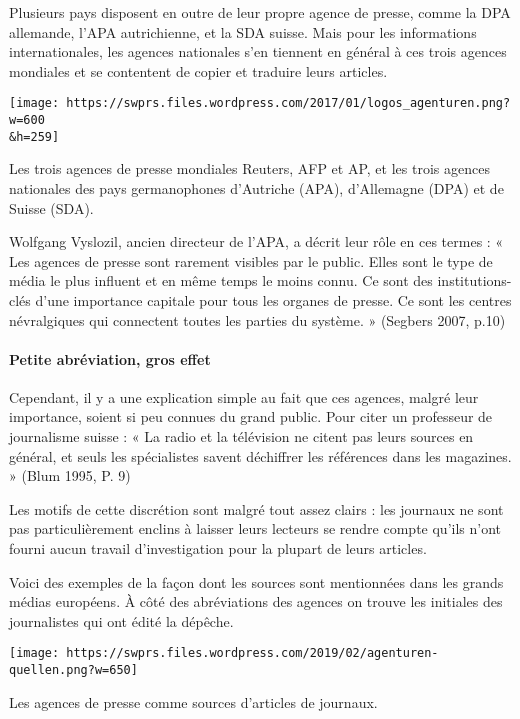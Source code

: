 Plusieurs pays disposent en outre de leur propre agence de presse, comme
la DPA allemande, l'APA autrichienne, et la SDA suisse. Mais pour les
informations internationales, les agences nationales s'en tiennent en
général à ces trois agences mondiales et se contentent de copier et
traduire leurs articles.

\texttt{[image: https://swprs.files.wordpress.com/2017/01/logos\_agenturen.png?w=600\\\&h=259]}

Les trois agences de presse mondiales Reuters, AFP et AP, et les trois
agences nationales des pays germanophones d'Autriche (APA), d'Allemagne
(DPA) et de Suisse (SDA).

Wolfgang Vyslozil, ancien directeur de l'APA, a décrit leur rôle en ces
termes : « Les agences de presse sont rarement visibles par le public.
Elles sont le type de média le plus influent et en même temps le moins
connu. Ce sont des institutions-clés d'une importance capitale pour tous
les organes de presse. Ce sont les centres névralgiques qui connectent
toutes les parties du système. » (Segbers 2007, p.10)

\hypertarget{petite-abruxe9viation-gros-effet}{%
\paragraph{Petite abréviation, gros
effet}\label{petite-abruxe9viation-gros-effet}}

Cependant, il y a une explication simple au fait que ces agences, malgré
leur importance, soient si peu connues du grand public. Pour citer un
professeur de journalisme suisse : « La radio et la télévision ne citent
pas leurs sources en général, et seuls les spécialistes savent
déchiffrer les références dans les magazines. » (Blum 1995, P. 9)

Les motifs de cette discrétion sont malgré tout assez clairs : les
journaux ne sont pas particulièrement enclins à laisser leurs lecteurs
se rendre compte qu'ils n'ont fourni aucun travail d'investigation pour
la plupart de leurs articles.

Voici des exemples de la façon dont les sources sont mentionnées dans
les grands médias européens. À côté des abréviations des agences on
trouve les initiales des journalistes qui ont édité la dépêche.

\texttt{[image: https://swprs.files.wordpress.com/2019/02/agenturen-quellen.png?w=650]}

Les agences de presse comme sources d'articles de journaux.

